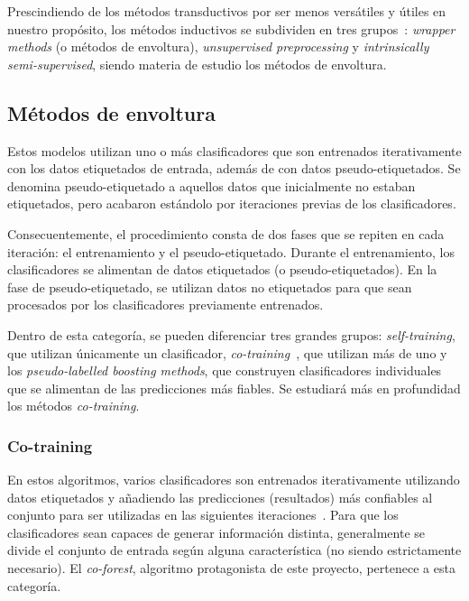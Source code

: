 Prescindiendo de los métodos transductivos por ser menos versátiles y útiles en nuestro propósito, los métodos inductivos se subdividen en tres grupos~\cite{engelen2020surveyOnSemiSupervised}: \textit{wrapper methods} (o métodos de envoltura), \textit{unsupervised preprocessing} y \textit{intrinsically semi-supervised}, siendo materia de estudio los métodos de envoltura. 


\subsection{Métodos de envoltura}

Estos modelos utilizan uno o más clasificadores que son entrenados iterativamente con los datos etiquetados de entrada, además de con datos pseudo-etiquetados. Se denomina pseudo-etiquetado a aquellos datos que inicialmente no estaban etiquetados, pero acabaron estándolo por iteraciones previas de los clasificadores.

Consecuentemente, el procedimiento consta de dos fases que se repiten en cada iteración: el entrenamiento y el pseudo-etiquetado. Durante el entrenamiento, los clasificadores se alimentan de datos etiquetados (o pseudo-etiquetados). En la fase de pseudo-etiquetado, se utilizan datos no etiquetados para que sean procesados por los clasificadores previamente entrenados. 

Dentro de esta categoría, se pueden diferenciar tres grandes grupos: \textit{self-training}, que utilizan únicamente un clasificador, \textit{co-training}~\cite{engelen2020surveyOnSemiSupervised}, que utilizan más de uno y los \textit{pseudo-labelled boosting methods}, que construyen clasificadores individuales que se alimentan de las predicciones más fiables. Se estudiará más en profundidad los métodos \textit{co-training}.

\subsubsection{Co-training}

En estos algoritmos, varios clasificadores son entrenados iterativamente utilizando datos etiquetados y añadiendo las predicciones (resultados) más confiables al conjunto para ser utilizadas en las siguientes iteraciones~\cite{engelen2020surveyOnSemiSupervised}. Para que los clasificadores sean capaces de generar información distinta, generalmente se divide el conjunto de entrada según alguna característica (no siendo estrictamente necesario). El \textit{co-forest}, algoritmo protagonista de este proyecto, pertenece a esta categoría.


